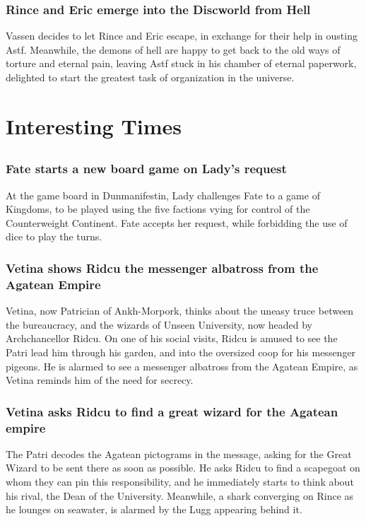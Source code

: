\subsubsection{\Gls{Rince} and \Gls{Eric} emerge into the Discworld from Hell}
\Gls{Vassen} decides to let \Gls{Rince} and \Gls{Eric} escape, in exchange for their help in
ousting \Gls{Astf}. Meanwhile, the demons of hell are happy to get back to the old ways of torture
and eternal pain, leaving \Gls{Astf} stuck in his chamber of eternal paperwork, delighted to start
the greatest task of organization in the universe.


\section{Interesting Times}


\subsection{}
\subsubsection{\Gls{Fate} starts a new board game on \Gls{Lady}'s request}
At the game board in Dunmanifestin, \Gls{Lady} challenges \Gls{Fate} to a game of Kingdoms, to be
played using the five factions vying for control of the Counterweight Continent. \Gls{Fate} accepts
her request, while forbidding the use of dice to play the turns.

\subsubsection{\Gls{Vetina} shows \Gls{Ridcu} the messenger albatross from the Agatean Empire}
\Gls{Vetina}, now Patrician of Ankh-Morpork, thinks about the uneasy truce between the bureaucracy,
and the wizards of Unseen University, now headed by Archchancellor \Gls{Ridcu}. On one of his social
visits, \Gls{Ridcu} is amused to see the \Gls{Patri} lead him through his garden, and into the
oversized coop for his messenger pigeons. He is alarmed to see a messenger albatross from the
Agatean Empire, as \Gls{Vetina} reminds him of the need for secrecy.

\subsubsection{\Gls{Vetina} asks \Gls{Ridcu} to find a great wizard for the Agatean empire}
The \Gls{Patri} decodes the Agatean pictograms in the message, asking for the Great Wizard to be
sent there as soon as possible. He asks \Gls{Ridcu} to find a scapegoat on whom they can pin this
responsibility, and he immediately starts to think about his rival, the \Gls{Dean} of the
University. Meanwhile, a shark converging on \Gls{Rince} as he lounges on seawater, is alarmed by
the \Gls{Lugg} appearing behind it.


